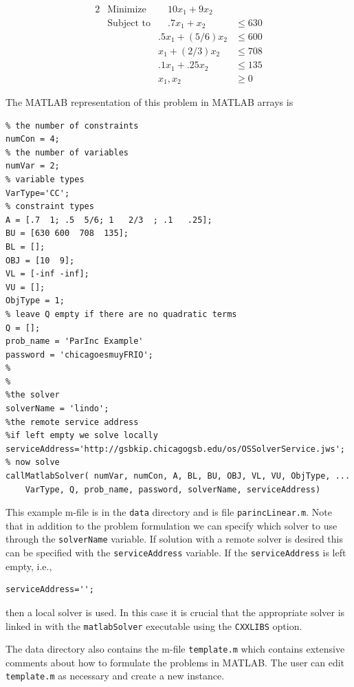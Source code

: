 \documentclass[11pt]{article}
\renewcommand{\_}{{\char"5F}}
\renewcommand{\{}{{\char"7B}}
\renewcommand{\}}{{\char"7D}}
\renewcommand{\^}{{\char"0D}}
\renewcommand{\'}{{\char"0D}}
\begin{document}
\begin{enumerate}[Step 1:]
\begin{alignat}{2}
& \mbox{Minimize} & \quad
10 x_{1} + 9 x_{2}\label{eq:parinobj}\\
& \mbox{Subject to} & \quad .7x_{1} + x_{2}  &\le 630  \label{eq:parinccon1}\\
& & .5x_{1} + (5/6) x_{2} &\le 600 \label{eq:parinccon2}\\
& &  x_{1} + (2/3) x_{2} &\le 708 \label{eq:parinccon3}\\
& & .1x_{1} + .25 x_{2} &\le 135 \label{eq:parinccon4}\\
& & x_{1}, x_{2} &\ge 0 \label{eq:parincnonneg}
\end{alignat}

The MATLAB representation of this problem in MATLAB arrays is
\begin{verbatim}
% the number of constraints
numCon = 4;
% the number of variables
numVar = 2;
% variable types
VarType='CC';
% constraint types
A = [.7  1; .5  5/6; 1   2/3  ; .1   .25];
BU = [630 600  708  135];
BL = [];
OBJ = [10  9];
VL = [-inf -inf];
VU = [];
ObjType = 1;
% leave Q empty if there are no quadratic terms
Q = [];
prob_name = 'ParInc Example'
password = 'chicagoesmuyFRIO';
%
%
%the solver
solverName = 'lindo';
%the remote service address
%if left empty we solve locally
serviceAddress='http://gsbkip.chicagogsb.edu/os/OSSolverService.jws';
% now solve
callMatlabSolver( numVar, numCon, A, BL, BU, OBJ, VL, VU, ObjType, ...
    VarType, Q, prob_name, password, solverName, serviceAddress)
\end{verbatim}
This example m-file is in the {\tt data} directory and is file {\tt parincLinear.m}. Note that in addition to the problem formulation 
we can specify which solver to use through the {\tt solverName} variable.  If solution with a remote solver is desired 
this can be specified with the {\tt serviceAddress} variable.  If the {\tt serviceAddress} is left empty, i.e.,
\begin{verbatim}
serviceAddress='';
\end{verbatim}
then a local solver is used. In this case  it is crucial that the appropriate solver is linked in with the {\tt matlabSolver} 
executable using the {\tt CXXLIBS} option.


The data directory  also contains the m-file  {\tt template.m} which contains extensive comments about how to formulate 
the problems in MATLAB.   The user can edit {\tt template.m} as necessary and create a new instance. 





\end{enumerate}
\end{document}
